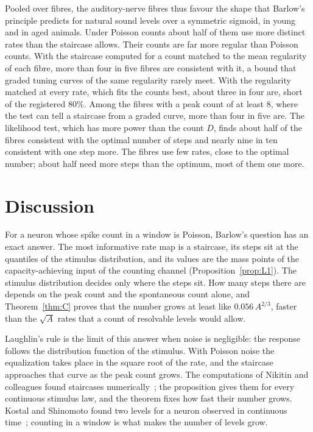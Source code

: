 \documentclass[10pt,letterpaper]{article}
\begin{document}
Pooled over fibres, the auditory-nerve fibres thus favour the shape that Barlow's principle predicts for natural sound levels over a
symmetric sigmoid, in young and in aged animals. Under Poisson counts about half of them use more distinct rates than the staircase allows. Their
counts are far more regular than Poisson counts. With the staircase computed for a count matched to the mean regularity of each fibre,
more than four in five fibres are consistent with it, a bound that graded tuning curves of the same regularity rarely meet. With the
regularity matched at every rate, which fits the counts best, about three in four are, short of the registered $80\%$. Among the
fibres with a peak count of at least 8, where the test can tell a staircase from a graded curve, more than four in five are. The
likelihood test, which has more power than the count $D$, finds about half of the fibres consistent with the optimal number of
steps and nearly nine in ten consistent with one step more. The fibres use few rates, close to the optimal number; about half
need more steps than the optimum, most of them one more.


\section{Discussion}\label{sec:discussion}

For a neuron whose spike count in a window is Poisson, Barlow's question has an exact answer. The most informative rate map is a
staircase, its steps sit at the quantiles of the stimulus distribution, and its values are the mass points of the capacity-achieving
input of the counting channel (Proposition~\ref{prop:L1}). The stimulus distribution decides only where the steps sit. How many steps
there are depends on the peak count and the spontaneous count alone, and Theorem~\ref{thm:C} proves that the number grows at least like
$0.056\,A^{2/3}$, faster than the $\sqrt A$ rates that a count of resolvable levels would allow.

Laughlin's rule is the limit of this answer when noise is negligible: the response follows the distribution function of the stimulus.
With Poisson noise the equalization takes place in the square root of the rate, and the staircase approaches that curve as the peak
count grows. The computations of Nikitin and colleagues found staircases numerically~\cite{Nikitin2009}; the proposition gives them
for every continuous stimulus law, and the theorem fixes how fast their number grows. Kostal and Shinomoto found two levels for a
neuron observed in continuous time~\cite{KostalShinomoto2016}; counting in a window is what makes the number of levels grow.
\end{document}
